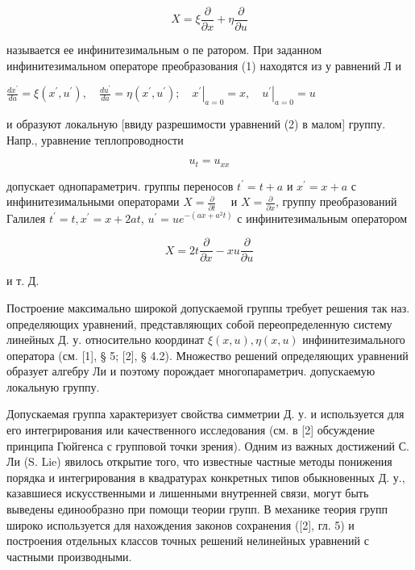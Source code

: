 \documentclass[10pt]{article}
\begin{document}
\[

X=\xi \frac{\partial}{\partial x}+\eta \frac{\partial}{\partial u}

\]



называется ее инфинитезимальным о пе ратором. При заданном инфинитезимальном операторе преобразования (1) находятся из у равнений Л и



$\frac{d x^{\prime}}{d a}=\xi\left(x^{\prime}, u^{\prime}\right), \quad \frac{d u^{\prime}}{d a}=\eta\left(x^{\prime}, u^{\prime}\right) ;\left.\quad x^{\prime}\right|_{a=0}=x,\left.\quad u^{\prime}\right|_{a=0}=u$



и образуют локальную [ввиду разрешимости уравнений (2) в малом] группу. Напр., уравнение теплопроводности



\[

u_{t}=u_{x x}

\]



допускает однопараметрич. группы переносов $t^{\prime}=t+a$ и $x^{\prime}=x+a$ с инфинитезимальными операторами $X=\frac{\partial}{\partial t} \quad$ и $X=\frac{\partial}{\partial x}$, группу преобразований Галилея $t^{\prime}=t, x^{\prime}=x+2 a t$, $u^{\prime}=u e^{-\left(a x+a^{2} t\right)}$ с инфинитезимальным оператором



\[

X=2 t \frac{\partial}{\partial x}-x u \frac{\partial}{\partial u}

\]



и т. Д.



Построение максимально широкой допускаемой группы требует решения так наз. определяющих уравнений, представляющих собой переопределенную систему линейных Д. у. относительно координат $\xi(x, u), \eta(x, u)$ инфинитезимального оператора (см. [1], § 5; [2], § 4.2). Множество решений определяющих уравнений образует алгебру Ли и поэтому порождает многопараметрич. допускаемую локальную группу.



Допускаемая группа характеризует свойства симметрии Д. у. и используется для его интегрирования или качественного исследования (см. в [2] обсуждение принципа Гюйгенса с групповой точки зрения). Одним из важных достижений С. Ли (S. Lie) явилось открытие того, что известные частные методы понижения порядка и интегрирования в квадратурах конкретных типов обыкновенных Д. у., казавшиеся искусственными и лишенными внутренней связи, могут быть выведены единообразно при помощи теории групп. В механике теория групп широко используется для нахождения законов сохранения ([2], гл. 5) и построения отдельных классов точных решений нелинейных уравнений с частными производными.
\end{document}
